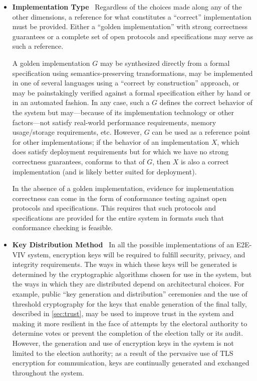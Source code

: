 \begin{itemize}
\item \textbf{Implementation Type} \ Regardless of the choices made
  along any of the other dimensions, a reference for what constitutes
  a ``correct'' implementation must be provided. Either a ``golden
  im\-ple\-men\-ta\-tion'' with strong correctness guarantees or a
  complete set of open protocols and specifications may serve as such
  a reference.

  A golden implementation $G$ may be synthesized directly from a
  formal specification using semantics-preserving transformations, may
  be implemented in one of several languages using a ``correct by
  construction'' approach, or may be painstakingly verified against a
  formal specification either by hand or in an automated fashion. In
  any case, such a $G$ defines the correct behavior of the system but
  may---because of its implementation technology or other
  factors---not satisfy real-world performance requirements, memory
  usage/storage requirements, etc.  However, $G$ can be used as a
  reference point for other implementations; if the behavior of an
  implementation $X$, which does satisfy deployment requirements but
  for which we have no strong correctness guarantees, conforms to that
  of $G$, then $X$ is also a correct implementation (and is likely
  better suited for deployment).

  In the absence of a golden implementation, evidence for
  implementation correctness can come in the form of conformance
  testing against open protocols and specifications. This requires
  that such protocols and specifications are provided for the entire
  system in formats such that conformance checking is feasible.

\item \textbf{Key Distribution Method} \ In all the possible
  implementations of an E2E-VIV system, encryption keys will be
  required to fulfill security, privacy, and integrity
  requirements. The ways in which these keys will be generated is
  determined by the cryptographic algorithms chosen for use in the
  system, but the ways in which they are distributed depend on
  architectural choices. For example, public ``key generation and
  distribution'' ceremonies and the use of threshold cryptography for
  the keys that enable generation of the final tally, described in
  \autoref{sec:trust}, may be used to improve trust in the system and
  making it more resilient in the face of attempts by the electoral
  authority to determine votes or prevent the completion of the
  election tally or its audit. However, the generation and use of
  encryption keys in the system is not limited to the election
  authority; as a result of the pervasive use of TLS encryption for
  communication, keys are continually generated and exchanged
  throughout the system.


\end{itemize}
